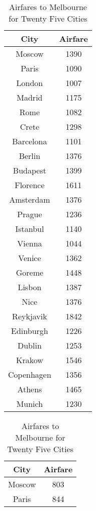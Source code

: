 \documentclass[12pt]{article}
\begin{document}
\begin{table}[ht]
	\begin{minipage}[b]{0.45\linewidth}
		\caption{Airfares from Melbourne for Twenty Five Cities}
		\centering
		\vspace{1mm}
		\begin{tabular}{c|c}
			\hline
			\rule{0pt}{2ex} City & Airfare  \\
			\hline
			\rule{0pt}{2ex}Moscow & 1390 \\
			Paris & 1090 \\
			London & 1007 \\
			Madrid & 1175 \\
			Rome & 1082 \\
			Crete & 1298 \\
			Barcelona & 1101 \\
			Berlin & 1376 \\
			Budapest & 1399 \\
			Florence & 1611 \\
			Amsterdam & 1376 \\
			Prague & 1236 \\
			Istanbul & 1140 \\
			Vienna & 1044 \\
			Venice & 1362 \\
			Goreme & 1448 \\
			Lisbon & 1387 \\
			Nice & 1376 \\
			Reykjavik & 1842 \\
			Edinburgh & 1226 \\
			Dublin & 1253 \\
			Krakow & 1546 \\
			Copenhagen & 1356 \\
			Athens & 1465 \\
			Munich &1230 \\
		\end{tabular}
	\end{minipage}
	\hspace{0.5cm}
	\begin{minipage}[b]{0.45\linewidth}
		\caption{Airfares to Melbourne for Twenty Five Cities}
		\centering
		\vspace{1mm}
		\begin{tabular}{c|c}
			\hline
			\rule{0pt}{2ex} City & Airfare  \\
			\hline
			\rule{0pt}{2ex}Moscow & 803 \\
			Paris & 844 \\

\end{tabular}
\end{minipage}
\end{table}
\end{document}
